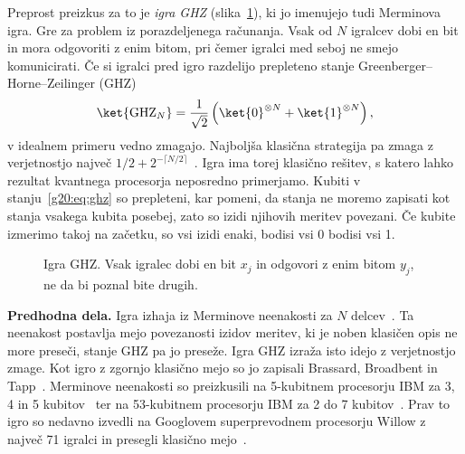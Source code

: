 Preprost preizkus za to je \emph{igra GHZ} (slika~\ref{g20:fig:igra}), ki jo imenujejo tudi Merminova igra. Gre za problem iz porazdeljenega računanja. Vsak od $N$ igralcev dobi en bit in mora odgovoriti z enim bitom, pri čemer igralci med seboj ne smejo komunicirati. Če si igralci pred igro razdelijo prepleteno stanje Greenberger--Horne--Zeilinger (GHZ)~\cite{g20:greenberger1990}
\begin{equation}
\ket{\mathrm{GHZ}_N} = \frac{1}{\sqrt{2}}\left(\ket{0}^{\otimes N} + \ket{1}^{\otimes N}\right),
\label{g20:eq:ghz}
\end{equation}
v idealnem primeru vedno zmagajo. Najboljša klasična strategija pa zmaga z verjetnostjo največ $1/2+2^{-\lceil N/2\rceil}$~\cite{g20:brassard2005}. Igra ima torej klasično rešitev, s katero lahko rezultat kvantnega procesorja neposredno primerjamo. Kubiti v stanju~\eqref{g20:eq:ghz} so prepleteni, kar pomeni, da stanja ne moremo zapisati kot stanja vsakega kubita posebej, zato so izidi njihovih meritev povezani. Če kubite izmerimo takoj na začetku, so vsi izidi enaki, bodisi vsi 0 bodisi vsi 1.

\begin{figure}[htbp]
\centering
{}
\caption{Igra GHZ. Vsak igralec dobi en bit $x_j$ in odgovori z enim bitom $y_j$, ne da bi poznal bite drugih.}
\label{g20:fig:igra}
\end{figure}

\textbf{Predhodna dela.} Igra izhaja iz Merminove neenakosti za $N$ delcev~\cite{g20:mermin1990}. Ta neenakost postavlja mejo povezanosti izidov meritev, ki je noben klasičen opis ne more preseči, stanje GHZ pa jo preseže. Igra GHZ izraža isto idejo z verjetnostjo zmage. Kot igro z zgornjo klasično mejo so jo zapisali Brassard, Broadbent in Tapp~\cite{g20:brassard2005}. Merminove neenakosti so preizkusili na 5-kubitnem procesorju IBM za 3, 4 in 5 kubitov~\cite{g20:alsina2016} ter na 53-kubitnem procesorju IBM za 2 do 7 kubitov~\cite{g20:huang2020}. Prav to igro so nedavno izvedli na Googlovem superprevodnem procesorju Willow z največ 71 igralci in presegli klasično mejo~\cite{g20:kumar2025}.


